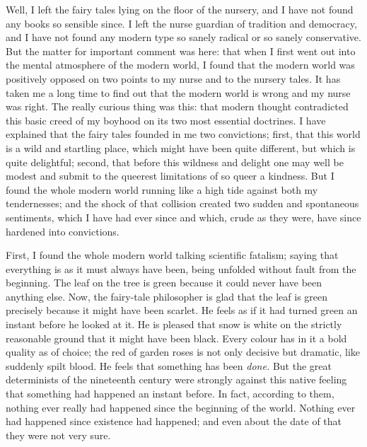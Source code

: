 \documentclass{book}
\begin{document}
Well, I left the fairy tales lying on the floor of the nursery, and I have not found any books so sensible since. I left the nurse guardian of tradition and democracy, and I have not found any modern type so sanely radical or so sanely conservative. But the matter for important comment was here: that when I first went out into the mental atmosphere of the modern world, I found that the modern world was positively opposed on two points to my nurse and to the nursery tales. It has taken me a long time to find out that the modern world is wrong and my nurse was right. The really curious thing was this: that modern thought contradicted this basic creed of my boyhood on its two most essential doctrines. I have explained that the fairy tales founded in me two convictions; first, that this world is a wild and startling place, which might have been quite different, but which is quite delightful; second, that before this wildness and delight one may well be modest and submit to the queerest limitations of so queer a kindness. But I found the whole modern world running like a high tide against both my tendernesses; and the shock of that collision created two sudden and spontaneous sentiments, which I have had ever since and which, crude as they were, have since hardened into convictions.

First, I found the whole modern world talking scientific fatalism; saying that everything is as it must always have been, being unfolded without fault from the beginning. The leaf on the tree is green because it could never have been anything else. Now, the fairy-tale philosopher is glad that the leaf is green precisely because it might have been scarlet. He feels as if it had turned green an instant before he looked at it. He is pleased that snow is white on the strictly reasonable ground that it might have been black. Every colour has in it a bold quality as of choice; the red of garden roses is not only decisive but dramatic, like suddenly spilt blood. He feels that something has been \emph{done.} But the great determinists of the nineteenth century were strongly against this native feeling that something had happened an instant before. In fact, according to them, nothing ever really had happened since the beginning of the world. Nothing ever had happened since existence had happened; and even about the date of that they were not very sure.
\end{document}
